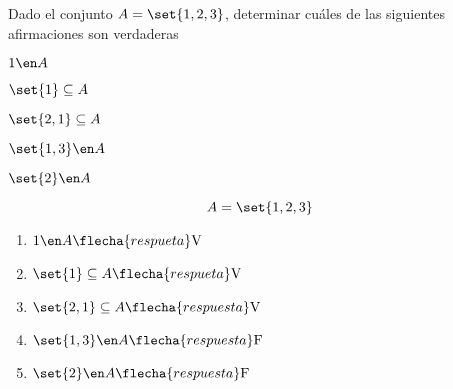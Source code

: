 \begin{enunciado}{\ejercicio}
  Dado el conjunto $A = \set{1,2,3}$, determinar cuáles de las siguientes afirmaciones son verdaderas
  \begin{enumerate}[label=(\roman*)]
    \begin{multicols}{5}
      \item $1 \en A $
      \item $\set{1} \subseteq A $
      \item $\set{2,1} \subseteq A $
      \item $\set{1,3} \en A $
      \item $\set{2} \en A $
    \end{multicols}
  \end{enumerate}

\end{enunciado}

$$
  A = \set{1,2,3}
$$
\begin{multicols}{3}
  \begin{enumerate}[label=(\roman*)]
    \item $1 \en A \flecha{respueta} \text{V}$
    \item $\set{1} \subseteq A \flecha{respueta} \text{V}$
    \item $\set{2,1} \subseteq A \flecha{respuesta} \text{V}$
    \item $\set{1,3} \en A \flecha{respuesta} \text{F}$
    \item $\set{2} \en A \flecha{respuesta} \text{F}$
  \end{enumerate}
\end{multicols}

\begin{aportes}
  \item {}
\end{aportes}
